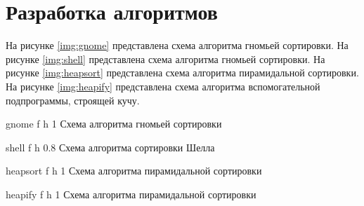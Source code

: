 \section{Разработка алгоритмов}

На рисунке \ref{img:gnome} представлена схема алгоритма гномьей сортировки. 
На рисунке \ref{img:shell} представлена схема алгоритма гномьей сортировки. 
На рисунке \ref{img:heapsort} представлена схема алгоритма пирамидальной сортировки. 
На рисунке \ref{img:heapify} представлена схема алгоритма вспомогательной подпрограммы, строящей кучу.
\clearpage

{gnome} %
{f} %
{h} %
{1\textwidth} %
{Схема алгоритма гномьей сортировки} %

{shell} %
{f} %
{h} %
{0.8\textwidth} %
{Схема алгоритма сортировки Шелла} %


{heapsort} %
{f} %
{h} %
{1\textwidth} %
{Схема алгоритма пирамидальной сортировки} %

{heapify} %
{f} %
{h} %
{1\textwidth} %
{Схема алгоритма пирамидальной сортировки} %
